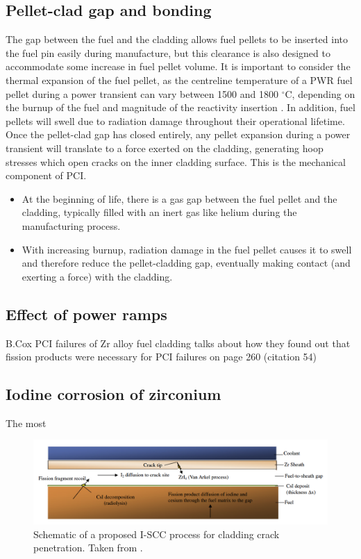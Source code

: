 \subsection{Pellet-clad gap and bonding}

The gap between the fuel and the cladding allows fuel pellets to be inserted into the fuel pin easily during manufacture, but this clearance is also designed to accommodate some increase in fuel pellet volume. It is important to consider the thermal expansion of the fuel pellet, as the centreline temperature of a PWR fuel pellet during a power transient can vary between 1500 and 1800 $^{\circ}$C, depending on the burnup of the fuel and magnitude of the reactivity insertion \cite{Bagger1994}. In addition, fuel pellets will swell due to radiation damage throughout their operational lifetime. Once the pellet-clad gap has closed entirely, any pellet expansion during a power transient will translate to a force exerted on the cladding, generating hoop stresses which open cracks on the inner cladding surface. This is the mechanical component of PCI.


\begin{itemize}
\item At the beginning of life, there is a gas gap between the fuel pellet and the cladding, typically filled with an inert gas like helium during the manufacturing process.
\item With increasing burnup, radiation damage in the fuel pellet causes it to swell and therefore reduce the pellet-cladding gap, eventually making contact (and exerting a force) with the cladding.
\end{itemize}

\subsection{Effect of power ramps}
B.Cox PCI failures of Zr alloy fuel cladding \cite{bcoxpelletclad1990} talks about how they found out that fission products were necessary for PCI failures on page 260 (citation 54)



\subsection{Iodine corrosion of zirconium}

The most 

\begin{figure}[htp]
\centering
\includegraphics[width=16cm]{images/vanarkel.png}
\caption[Schematic of a proposed I-SCC process for cladding crack penetration.]{Schematic of a proposed I-SCC process for cladding crack penetration. Taken from \cite{Lewis2011}.}
\label{figure:vanarkel}
\end{figure}

